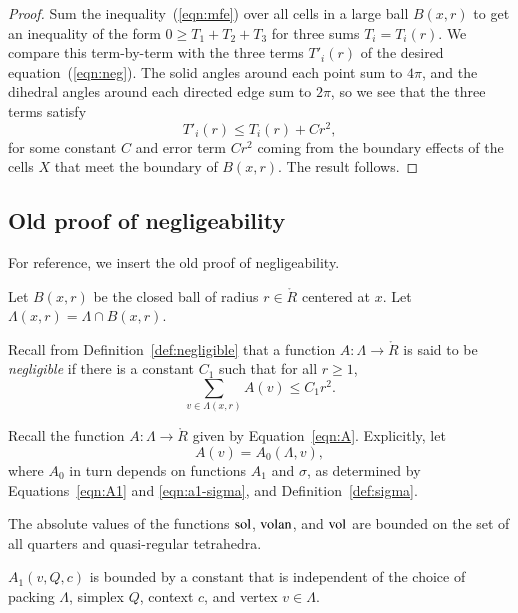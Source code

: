 \begin{proof}
Sum the inequality~(\ref{eqn:mfe}) over all cells in a large ball $B(x,r)$ to get an
inequality of the form $0\ge T_1 + T_2 + T_3$ for three sums $T_i = T_i(r)$.  We compare this term-by-term
with the three terms $T'_i(r)$ of the desired equation~(\ref{eqn:neg}).  The solid angles around each point sum to
$4\pi$, and the dihedral angles around each directed edge sum to $2\pi$, so we see that
the three terms satisfy
$$T'_i(r) \le T_i(r) + C r^2,$$
for some constant $C$ and error term $C r^2$ coming from the boundary effects of the cells $X$ that meet the boundary of $B(x,r)$.  The result follows.
\end{proof}

\subsection{Old proof of negligeability}

For reference, we insert the old proof of negligeability.

Let $B(x,r)$ be the closed ball of radius $r\in\ring{R}$ centered
at $x$.  Let $\Lambda(x,r)=\Lambda\cap B(x,r)$.

Recall from Definition~\ref{def:negligible} that a function
$A:\Lambda\to\ring{R}$ is said to be {\it negligible} if there is a
constant $C_1$ such that for all $r\ge1$,
   $$\sum_{v\in\Lambda(x,r) } A(v) \le C_1 r^2.$$
%


Recall the function $A: \Lambda\to\ring{R}$ given by
Equation~\ref{eqn:A}.  Explicitly, let
   $$A(v) = A_0(\Lambda,v),$$
where $A_0$ in turn depends on functions $A_1$ and $\sigma$, as
determined by Equations~\ref{eqn:A1} and \ref{eqn:a1-sigma}, and
Definition~\ref{def:sigma}.

\begin{claim}\label{claim:negbounds}
    The absolute values of the functions $\operatorname{sol}$, ${\operatorname{volan}}$, and ${\operatorname{vol}}$
are bounded on the set of all quarters and
    quasi-regular tetrahedra.
\end{claim}


\begin{lemma}\label{lemma:A1bound}  $A_1(v,Q,c)$ is bounded by a constant that is
independent of the choice of packing $\Lambda$, simplex
$Q$, context $c$, and vertex $v\in\Lambda$.
\end{lemma}

